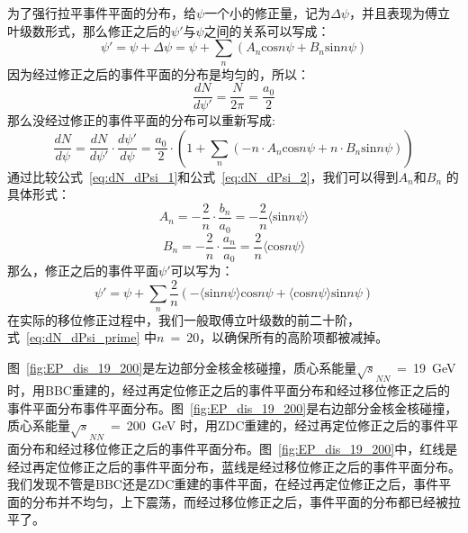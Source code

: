 \begin{itemize}
为了强行拉平事件平面的分布，给$\psi$一个小的修正量，记为$\Delta\psi$，并且表现为傅立叶级数形式，那么修正之后的$\psi\prime$与$\psi$之间的关系可以写成：
\begin{equation}
\psi\prime = \psi + \Delta\psi = \psi + \sum_{n}(A_{n}\mathrm{cos}n\psi + B_{n}\mathrm{sin}n\psi)
\end{equation}
因为经过修正之后的事件平面的分布是均匀的，所以：
\begin{equation}
\frac{dN}{d\psi\prime} = \frac{N}{2\pi} = \frac{a_{0}}{2}
\end{equation}
那么没经过修正的事件平面的分布可以重新写成:
\begin{equation}
\frac{dN}{d\psi} = \frac{dN}{d\psi\prime} \cdot \frac{d\psi\prime}{d\psi} = \frac{a_{0}}{2} \cdot (1+\sum_{n}(-n \cdot A_{n}\mathrm{cos}n\psi + n \cdot B_{n}\mathrm{sin}n\psi))
\label{eq:dN_dPsi_2}
\end{equation}
通过比较公式~\ref{eq:dN_dPsi_1}和公式~\ref{eq:dN_dPsi_2}，我们可以得到$A_{n}$和$B_{n}$ 的具体形式：
\begin{equation}
A_{n} = -\frac{2}{n} \cdot \frac{b_{n}}{a_{0}} = -\frac{2}{n} \langle \mathrm{sin}n\psi \rangle
\end{equation}
\begin{equation}
B_{n} = -\frac{2}{n} \cdot \frac{a_{n}}{a_{0}} = \frac{2}{n} \langle \mathrm{cos}n\psi \rangle
\end{equation}
那么，修正之后的事件平面$\psi\prime$可以写为：
\begin{equation}
\psi\prime = \psi + \sum_{n} \frac{2}{n}( -\langle \mathrm{sin}n\psi \rangle \mathrm{cos}n\psi + \langle \mathrm{cos}n\psi \rangle \mathrm{sin}n\psi)
\label{eq:dN_dPsi_prime}
\end{equation}
在实际的移位修正过程中，我们一般取傅立叶级数的前二十阶，式~\ref{eq:dN_dPsi_prime} 中$n$~=~20，以确保所有的高阶项都被减掉。
\end{itemize}

图~\ref{fig:EP_dis_19_200}是左边部分金核金核碰撞，质心系能量$\sqrt{s}_{NN}$~=~19~GeV时，用BBC重建的，经过再定位修正之后的事件平面分布和经过移位修正之后的事件平面分布事件平面分布。图~\ref{fig:EP_dis_19_200}是右边部分金核金核碰撞，质心系能量$\sqrt{s}_{NN}$~=~200~GeV 时，用ZDC重建的，经过再定位修正之后的事件平面分布和经过移位修正之后的事件平面分布。图~\ref{fig:EP_dis_19_200}中，红线是经过再定位修正之后的事件平面分布，蓝线是经过移位修正之后的事件平面分布。我们发现不管是BBC还是ZDC重建的事件平面，在经过再定位修正之后，事件平面的分布并不均匀，上下震荡，而经过移位修正之后，事件平面的分布都已经被拉平了。


